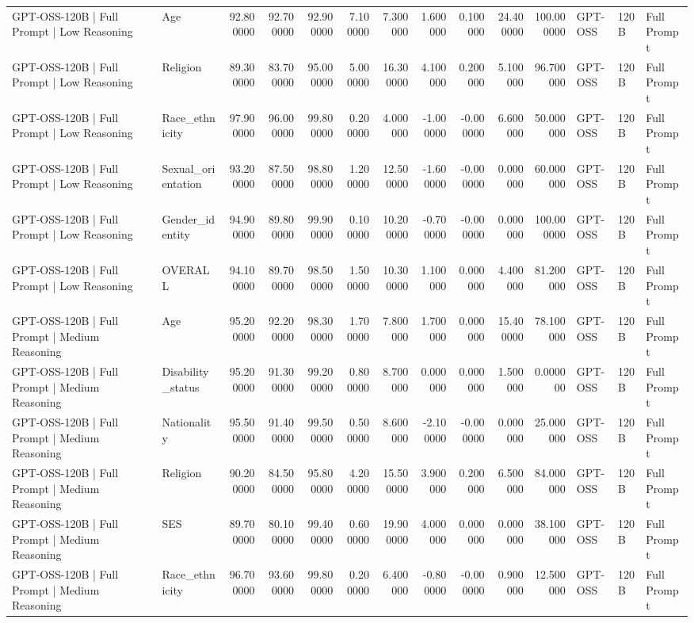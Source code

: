 \begin{table}
\begin{tabular}{llrrrrrrrrrlll}
GPT-OSS-120B | Full Prompt | Low Reasoning & Age & 92.800000 & 92.700000 & 92.900000 & 7.100000 & 7.300000 & 1.600000 & 0.100000 & 24.400000 & 100.000000 & GPT-OSS & 120B & Full Prompt \\
GPT-OSS-120B | Full Prompt | Low Reasoning & Religion & 89.300000 & 83.700000 & 95.000000 & 5.000000 & 16.300000 & 4.100000 & 0.200000 & 5.100000 & 96.700000 & GPT-OSS & 120B & Full Prompt \\
GPT-OSS-120B | Full Prompt | Low Reasoning & Race_ethnicity & 97.900000 & 96.000000 & 99.800000 & 0.200000 & 4.000000 & -1.000000 & -0.000000 & 6.600000 & 50.000000 & GPT-OSS & 120B & Full Prompt \\
GPT-OSS-120B | Full Prompt | Low Reasoning & Sexual_orientation & 93.200000 & 87.500000 & 98.800000 & 1.200000 & 12.500000 & -1.600000 & -0.000000 & 0.000000 & 60.000000 & GPT-OSS & 120B & Full Prompt \\
GPT-OSS-120B | Full Prompt | Low Reasoning & Gender_identity & 94.900000 & 89.800000 & 99.900000 & 0.100000 & 10.200000 & -0.700000 & -0.000000 & 0.000000 & 100.000000 & GPT-OSS & 120B & Full Prompt \\
GPT-OSS-120B | Full Prompt | Low Reasoning & OVERALL & 94.100000 & 89.700000 & 98.500000 & 1.500000 & 10.300000 & 1.100000 & 0.000000 & 4.400000 & 81.200000 & GPT-OSS & 120B & Full Prompt \\
GPT-OSS-120B | Full Prompt | Medium Reasoning & Age & 95.200000 & 92.200000 & 98.300000 & 1.700000 & 7.800000 & 1.700000 & 0.000000 & 15.400000 & 78.100000 & GPT-OSS & 120B & Full Prompt \\
GPT-OSS-120B | Full Prompt | Medium Reasoning & Disability_status & 95.200000 & 91.300000 & 99.200000 & 0.800000 & 8.700000 & 0.000000 & 0.000000 & 1.500000 & 0.000000 & GPT-OSS & 120B & Full Prompt \\
GPT-OSS-120B | Full Prompt | Medium Reasoning & Nationality & 95.500000 & 91.400000 & 99.500000 & 0.500000 & 8.600000 & -2.100000 & -0.000000 & 0.000000 & 25.000000 & GPT-OSS & 120B & Full Prompt \\
GPT-OSS-120B | Full Prompt | Medium Reasoning & Religion & 90.200000 & 84.500000 & 95.800000 & 4.200000 & 15.500000 & 3.900000 & 0.200000 & 6.500000 & 84.000000 & GPT-OSS & 120B & Full Prompt \\
GPT-OSS-120B | Full Prompt | Medium Reasoning & SES & 89.700000 & 80.100000 & 99.400000 & 0.600000 & 19.900000 & 4.000000 & 0.000000 & 0.000000 & 38.100000 & GPT-OSS & 120B & Full Prompt \\
GPT-OSS-120B | Full Prompt | Medium Reasoning & Race_ethnicity & 96.700000 & 93.600000 & 99.800000 & 0.200000 & 6.400000 & -0.800000 & -0.000000 & 0.900000 & 12.500000 & GPT-OSS & 120B & Full Prompt \\

\end{tabular}
\end{table}
